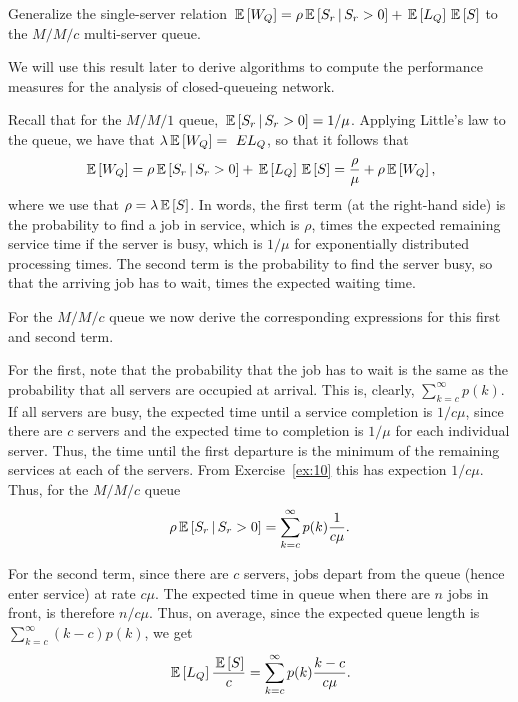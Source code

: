 \begin{question}
  Generalize the single-server relation
  $\,\mathbb{E}\left[W_Q\right] = \rho \,\mathbb{E}\left[S_r\,\middle|\, S_r>0\right] + \,\mathbb{E}\left[L_Q\right] \,\mathbb{E}\left[S\right]$ to the $M/M/c$
  multi-server queue. 

We will use this result later to derive algorithms to compute the
performance measures for the analysis of closed-queueing network.

  \begin{solution}

    Recall that for the $M/M/1$ queue, $\,\mathbb{E}\left[S_r\,\middle|\, S_r>0\right] = 1/\mu$.
    Applying Little's law to the queue, we have that
    $\lambda \,\mathbb{E}\left[W_Q\right] =\ E{L_Q}$, so that it follows that
    \begin{equation*}
    \,\mathbb{E}\left[W_Q\right] = \rho \,\mathbb{E}\left[S_r \,\middle|\, S_r > 0\right] + \,\mathbb{E}\left[L_Q\right]\,\mathbb{E}\left[S\right] = \frac{\rho}\mu + \rho \,\mathbb{E}\left[W_Q\right],
    \end{equation*}
    where we use that $\rho=\lambda \,\mathbb{E}\left[S\right]$. In words, the first term
    (at the right-hand side) is the probability to find a job in
    service, which is $\rho$, times the expected remaining service
    time if the server is busy, which is $1/\mu$ for exponentially
    distributed processing times. The second term is the probability
    to find the server busy, so that the arriving job has to wait,
    times the expected waiting time. 

    For the $M/M/c$ queue we now derive the corresponding expressions
    for this first and second term.

    For the first, note that the probability that the job has to wait
    is the same as the probability that all servers are occupied at
    arrival. This is, clearly, $\sum_{k=c}^\infty p(k)$. If all
    servers are busy, the expected time until a service completion is
    $1/c\mu$, since there are $c$ servers and the expected time to
    completion is $1/\mu$ for each individual server. Thus, the time
    until the first departure is the minimum of the remaining services
    at each of the servers. From Exercise~\ref{ex:10} this has
    expection $1/c\mu$. Thus, for the $M/M/c$ queue
    \begin{equation*}
\rho\,\mathbb{E}\left[S_r\,\middle|\, S_r>0\right]  = \sum_{k=c}^\infty p(k) \frac 1{c\mu}.
    \end{equation*}


    For the second term, since there are $c$ servers, jobs depart from
    the queue (hence enter service) at rate $c\mu$. The expected time
    in queue when there are $n$ jobs in front, is therefore
    $n/c\mu$. Thus, on average, since the expected queue length is $\sum_{k=c}^\infty (k-c)p(k)$, we 
get 
\begin{equation*}
  \,\mathbb{E}\left[L_Q\right]\frac{\,\mathbb{E}\left[S\right]}c = \sum_{k=c}^\infty p(k)\frac{k-c}{c\mu}.
\end{equation*}


\end{solution}
\end{question}
